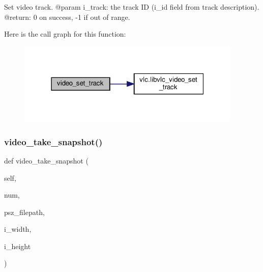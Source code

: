\begin{DoxyVerb}Set video track.
@param i_track: the track ID (i_id field from track description).
@return: 0 on success, -1 if out of range.
\end{DoxyVerb}
 Here is the call graph for this function\+:
\nopagebreak
\begin{figure}[H]
\begin{center}
\leavevmode
\includegraphics[width=304pt]{classvlc_1_1_media_player_a4e425c5d1cb8aa16fc59321650801def_cgraph}
\end{center}
\end{figure}
\mbox{\label{classvlc_1_1_media_player_aa8c63c57da5e893491429ce65cb18c02}} 
\subsubsection{\texorpdfstring{video\+\_\+take\+\_\+snapshot()}{video\_take\_snapshot()}}
{\footnotesize\ttfamily def video\+\_\+take\+\_\+snapshot (\begin{DoxyParamCaption}\item[{}]{self,  }\item[{}]{num,  }\item[{}]{psz\+\_\+filepath,  }\item[{}]{i\+\_\+width,  }\item[{}]{i\+\_\+height }\end{DoxyParamCaption})}

